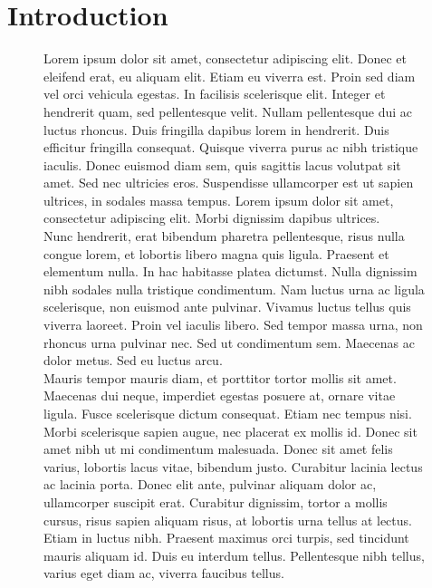 \documentclass[12pt]{article}
\theoremstyle{definition}\newtheorem{defn}{Définition}
\theoremstyle{definition}\newtheorem{exm}{Exemple}
\theoremstyle{definition}\newtheorem{rem}{Remarque}
\theoremstyle{definition}\newtheorem{algo}{Algorithme}
\theoremstyle{remark}\newtheorem{exo}{Exercice}
\theoremstyle{remark}\newtheorem{nota}{Notation}
\begin{document}

\tableofcontents


\section*{Introduction}
\begin{figure}[h]
Lorem ipsum dolor sit amet, consectetur adipiscing elit. Donec et eleifend erat, eu aliquam elit. Etiam eu viverra est. Proin sed diam vel orci vehicula egestas. In facilisis scelerisque elit. Integer et hendrerit quam, sed pellentesque velit. Nullam pellentesque dui ac luctus rhoncus. Duis fringilla dapibus lorem in hendrerit. Duis efficitur fringilla consequat. Quisque viverra purus ac nibh tristique iaculis. Donec euismod diam sem, quis sagittis lacus volutpat sit amet. Sed nec ultricies eros. Suspendisse ullamcorper est ut sapien ultrices, in sodales massa tempus. Lorem ipsum dolor sit amet, consectetur adipiscing elit. Morbi dignissim dapibus ultrices.\\

Nunc hendrerit, erat bibendum pharetra pellentesque, risus nulla congue lorem, et lobortis libero magna quis ligula. Praesent et elementum nulla. In hac habitasse platea dictumst. Nulla dignissim nibh sodales nulla tristique condimentum. Nam luctus urna ac ligula scelerisque, non euismod ante pulvinar. Vivamus luctus tellus quis viverra laoreet. Proin vel iaculis libero. Sed tempor massa urna, non rhoncus urna pulvinar nec. Sed ut condimentum sem. Maecenas ac dolor metus. Sed eu luctus arcu.\\

Mauris tempor mauris diam, et porttitor tortor mollis sit amet. Maecenas dui neque, imperdiet egestas posuere at, ornare vitae ligula. Fusce scelerisque dictum consequat. Etiam nec tempus nisi. Morbi scelerisque sapien augue, nec placerat ex mollis id. Donec sit amet nibh ut mi condimentum malesuada. Donec sit amet felis varius, lobortis lacus vitae, bibendum justo. Curabitur lacinia lectus ac lacinia porta. Donec elit ante, pulvinar aliquam dolor ac, ullamcorper suscipit erat. Curabitur dignissim, tortor a mollis cursus, risus sapien aliquam risus, at lobortis urna tellus at lectus. Etiam in luctus nibh. Praesent maximus orci turpis, sed tincidunt mauris aliquam id. Duis eu interdum tellus. Pellentesque nibh tellus, varius eget diam ac, viverra faucibus tellus.
\end{figure}
\end{document}
